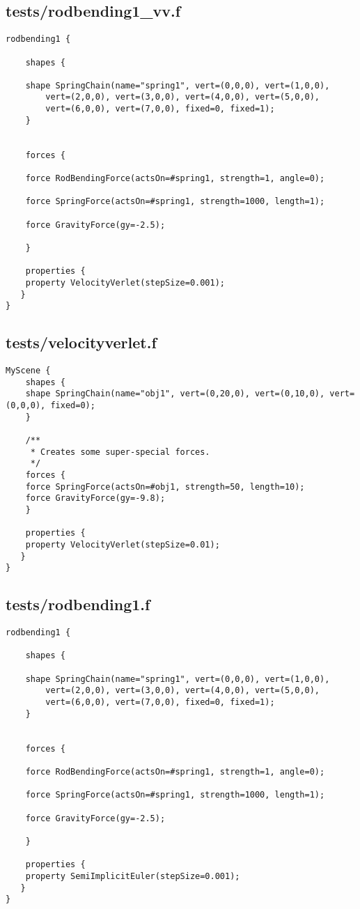 \subsection*{tests/rodbending1\_vv.f}
\begin{lstlisting}
rodbending1 {

    shapes {

	shape SpringChain(name="spring1", vert=(0,0,0), vert=(1,0,0),
		vert=(2,0,0), vert=(3,0,0), vert=(4,0,0), vert=(5,0,0),
		vert=(6,0,0), vert=(7,0,0), fixed=0, fixed=1);
    }


    forces {
	
	force RodBendingForce(actsOn=#spring1, strength=1, angle=0);

	force SpringForce(actsOn=#spring1, strength=1000, length=1);

	force GravityForce(gy=-2.5);
	
    }

    properties { 
	property VelocityVerlet(stepSize=0.001);
   }
}

\end{lstlisting}

\subsection*{tests/velocityverlet.f}
\begin{lstlisting}
MyScene {
    shapes {
	shape SpringChain(name="obj1", vert=(0,20,0), vert=(0,10,0), vert=(0,0,0), fixed=0);
    }

    /**
     * Creates some super-special forces.
     */
    forces {
	force SpringForce(actsOn=#obj1, strength=50, length=10);
	force GravityForce(gy=-9.8);
    }

    properties { 
	property VelocityVerlet(stepSize=0.01);
   }
}
\end{lstlisting}

\subsection*{tests/rodbending1.f}
\begin{lstlisting}
rodbending1 {

    shapes {

	shape SpringChain(name="spring1", vert=(0,0,0), vert=(1,0,0),
		vert=(2,0,0), vert=(3,0,0), vert=(4,0,0), vert=(5,0,0),
		vert=(6,0,0), vert=(7,0,0), fixed=0, fixed=1);
    }


    forces {
	
	force RodBendingForce(actsOn=#spring1, strength=1, angle=0);

	force SpringForce(actsOn=#spring1, strength=1000, length=1);

	force GravityForce(gy=-2.5);
	
    }

    properties { 
	property SemiImplicitEuler(stepSize=0.001);
   }
}

\end{lstlisting}

